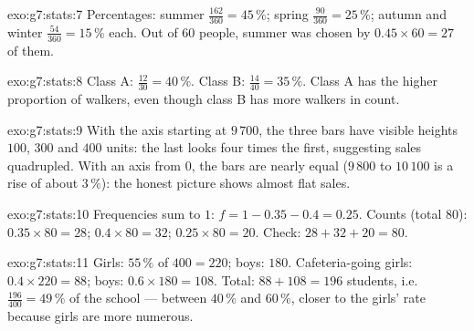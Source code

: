 \begin{solution}{exo:g7:stats:7}
Percentages: summer $\frac{162}{360} = 45\,\%$; spring
$\frac{90}{360} = 25\,\%$; autumn and winter
$\frac{54}{360} = 15\,\%$ each. Out of $60$ people, summer was chosen
by $0.45 \times 60 = 27$ of them.
\end{solution}

\begin{solution}{exo:g7:stats:8}
Class A: $\frac{12}{30} = 40\,\%$. Class B: $\frac{14}{40} = 35\,\%$.
Class A has the higher proportion of walkers, even though class B has
more walkers in count.
\end{solution}

\begin{solution}{exo:g7:stats:9}
With the axis starting at $9\,700$, the three bars have visible
heights $100$, $300$ and $400$ units: the last looks four times the
first, suggesting sales quadrupled. With an axis from $0$, the bars
are nearly equal ($9\,800$ to $10\,100$ is a rise of about $3\,\%$):
the honest picture shows almost flat sales.
\end{solution}

\begin{solution}{exo:g7:stats:10}
Frequencies sum to $1$: $f = 1 - 0.35 - 0.4 = 0.25$. Counts (total
$80$): $0.35 \times 80 = 28$; $0.4 \times 80 = 32$;
$0.25 \times 80 = 20$. Check: $28 + 32 + 20 = 80$.
\end{solution}

\begin{solution}{exo:g7:stats:11}
Girls: $55\,\%$ of $400 = 220$; boys: $180$. Cafeteria-going girls:
$0.4 \times 220 = 88$; boys: $0.6 \times 180 = 108$. Total:
$88 + 108 = 196$ students, i.e.\ $\frac{196}{400} = 49\,\%$ of the
school --- between $40\,\%$ and $60\,\%$, closer to the girls' rate
because girls are more numerous.
\end{solution}

